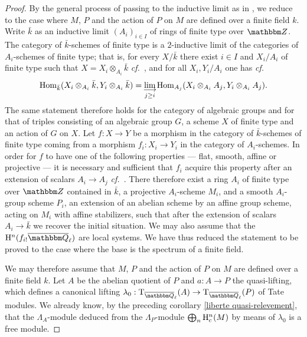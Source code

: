 \documentclass[12pt,english]{smfart}
\numberwithin{equation}{subsection}
\theoremstyle{remark}
\newcommand\limind{\mathop{\oalign{
{\rm lim}\cr\hidewidth$\longrightarrow$\hidewidth\cr}}}
\newcommand\rmT{{\rm T}}
\newcommand\ZZ{{\mathbbm Z}}
\newcommand\QQ{{\mathbbm Q}}
\newcommand\rmH{{\rm H}}
\newcommand\cf{{\it cf.\ }}
\newcommand\Ql{{\overline\QQ_\ell}}
\begin{document}
\begin{proof}
By the general process of passing to the inductive limit as in \cite[6.1.7]{BBD}, we reduce to the case where $M$, $P$ and the action of $P$ on $M$ are defined over a finite field $k$. Write $\bar k$ as an inductive limit $(A_i)_{i\in I}$ of rings of finite type over $\ZZ$. The category of $\bar k$-schemes of finite type is a $2$-inductive limit of the categories of $A_i$-schemes of finite type; that is, for every $X/\bar k$ there exist $i\in I$ and $X_i/A_i$ of finite type such that $X=X_i\otimes_{A_i}\bar k$ \cf \cite[8.9.1]{EGA4}, and for all $X_i,Y_i/A_i$ one has \cf \cite[8.8.2]{EGA4}
$${\rm Hom}_{\bar k}(X_i\otimes_{A_i}\bar k,Y_i\otimes_{A_i}\bar k)=\limind_{j\geq i} {\rm Hom}_{A_j}(X_i\otimes_{A_i}A_j,Y_i\otimes_{A_i}A_j).$$
The same statement therefore holds for the category of algebraic groups and for that of triples consisting of an algebraic group $G$, a scheme $X$ of finite type and an action of $G$ on $X$. Let $f:X\rightarrow Y$ be a morphism in the category of $\bar k$-schemes of finite type coming from a morphism $f_i:X_i\rightarrow Y_i$ in the category of $A_i$-schemes. In order for $f$ to have one of the following properties --- flat, smooth, affine or projective --- it is necessary and sufficient that $f_i$ acquire this property after an extension of scalars $A_i\rightarrow A_j$ \cf \cite[11.2.6 and 8.10.5]{EGA4}. There therefore exist a ring $A_i$ of finite type over $\ZZ$ contained in $\bar k$, a projective $A_i$-scheme $M_i$, and a smooth $A_i$-group scheme $P_i$, an extension of an abelian scheme by an affine group scheme, acting on $M_i$ with affine stabilizers, such that after the extension of scalars $A_i\rightarrow \bar k$ we recover the initial situation. We may also assume that the $\rmH^n(f_{i!}\Ql)$ are local systems. We have thus reduced the statement to be proved to the case where the base is the spectrum of a finite field.

We may therefore assume that $M$, $P$ and the action of $P$ on $M$ are defined over a finite field $k$. Let $A$ be the abelian quotient of $P$ and $a:A\rightarrow P$ the quasi-lifting, which defines a canonical lifting $\lambda_0:\rmT_\Ql(A)\rightarrow \rmT_\Ql(P)$ of Tate modules. We already know, by the preceding corollary \ref{liberte quasi-relevement}, that the $\Lambda_A$-module deduced from the $\Lambda_P$-module $\bigoplus_n \rmH^n_c(M)$ by means of $\lambda_0$ is a free module.


\end{proof}
\end{document}

